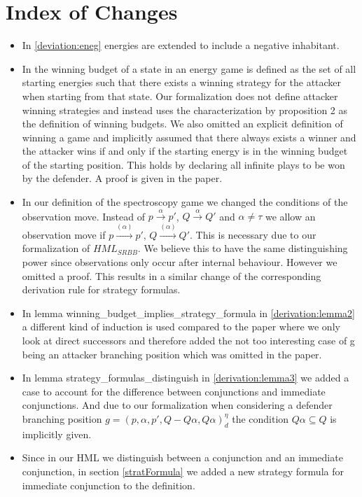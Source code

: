 \section{Index of Changes}
\begin{itemize}
    \item In \ref{deviation:eneg} energies are extended to include a negative inhabitant. 
    \item In \cite{bisping2023lineartimebranchingtime} the winning budget of a state in an energy game 
is defined as the set of all starting energies such that there exists a winning strategy for the attacker 
when starting from that state. Our formalization does not define attacker winning strategies and instead 
uses the characterization by proposition 2 \cite[p. 9]{bisping2023lineartimebranchingtime} as the definition of winning budgets.
We also omitted an explicit definition of winning a game and implicitly assumed that there 
always exists a winner and the attacker wins if and only if the starting energy is in the winning budget of the starting position. This holds by declaring all
infinite plays to be won by the defender. A proof is given in the paper. 
    \item In our definition of the spectroscopy game we changed the conditions of the observation move. 
    Instead of $p \overset{\alpha}{\longrightarrow}p'$, $Q \overset{\alpha}{\longrightarrow} Q'$ and $\alpha \neq \tau$
    we allow an observation move if  $p \overset{(\alpha)}{\longrightarrow}p'$, $Q \overset{(\alpha)}{\longrightarrow} Q'$.
    This is necessary due to our formalization of $HML_{SRBB}$. We believe this to have the same distinguishing power 
    since observations only occur after internal behaviour. However we omitted a proof. 
    This results in a similar change of the corresponding derivation rule for strategy formulas.
    \item In lemma winning\_budget\_implies\_strategy\_formula in \ref{derivation:lemma2} a different kind of induction is used compared to the paper 
    where we only look at direct successors and therefore added the not too interesting case of g being an 
    attacker branching position which was omitted in the paper.
   \item In lemma strategy\_formulas\_distinguish in  \ref{derivation:lemma3} we added a case to account for the difference between 
conjunctions and immediate conjunctions. And due to our formalization when considering a
defender branching position $g=(p,\alpha ,p', Q - Q\alpha, Q\alpha)_d^\eta$ the condition 
$Q \alpha \subseteq Q$ is implicitly given.
  \item Since in our HML we distinguish between a conjunction and an immediate conjunction, in section \ref{stratFormula} 
we added a new strategy formula for immediate conjunction to the definition.
\end{itemize}
